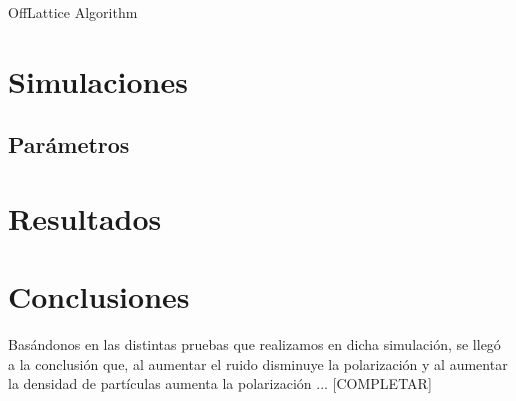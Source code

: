 \documentclass[12pt, a4paper]{report}
\makeatletter
\def\BState{\State\hskip-\ALG@thistlm}
\makeatother
\begin{document}
\begin{algorithm}
    \caption{OffLattice Algorithm}\label{offLattice}
\end{algorithm}

\section{Simulaciones}

\subsection{Parámetros}

\section{Resultados}

\section{Conclusiones}
Basándonos en las distintas pruebas que realizamos en dicha simulación, se llegó a la 
conclusión que, al aumentar el ruido disminuye la polarización y al aumentar la densidad de
partículas aumenta la polarización ... [COMPLETAR]
\end{document}
